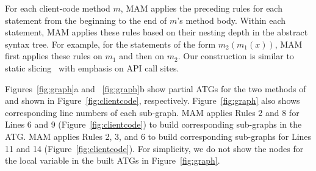 For each client-code method $m$, MAM applies the preceding
rules for each statement from the beginning to the end of $m$'s method body.
Within each statement, MAM applies these rules based on
their nesting depth in the abstract syntax tree. For example,
for the statements of the form $m_2(m_1(x))$, MAM first applies
these rules on $m_1$ and then on $m_2$. Our construction is similar to static slicing~\cite{tip1995survey} with emphasis on API call sites.

Figures~\ref{fig:graph}a and ~\ref{fig:graph}b show partial ATGs for the two  methods of  and  shown in Figure~\ref{fig:clientcode}, respectively.
Figure~\ref{fig:graph} also shows corresponding line numbers of each
sub-graph. MAM applies Rules 2 and 8 for Lines 6 and 9
(Figure~\ref{fig:clientcode}) to build corresponding sub-graphs in
the ATG. MAM applies Rules 2, 3, and 6 to build corresponding
sub-graphs for Lines 11 and 14 (Figure~\ref{fig:clientcode}). For simplicity,
we do not show the nodes for the local variable  in the built ATGs in Figure~\ref{fig:graph}.


